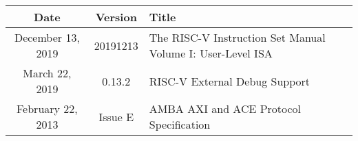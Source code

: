 \begin{center}
{
  \vspace{0.5em}
  \small
  \begin{tabularx}{0.9\textwidth}{|c|c|X|}
    \hline
    \cellcolor{gray!20}\textbf{Date} & \cellcolor{gray!20}\textbf{Version} & \cellcolor{gray!20}\textbf{Title} \\
    \hline
    December 13, 2019 & 20191213 & The RISC-V Instruction Set Manual Volume I: User-Level ISA \\
    \hline
    March 22, 2019 & 0.13.2 & RISC-V External Debug Support \\
    \hline
    February 22, 2013 & Issue E & AMBA AXI and ACE Protocol Specification \\
    \hline
  \end{tabularx}
  \vspace{0.5em}
}
\end{center}

\newpage
